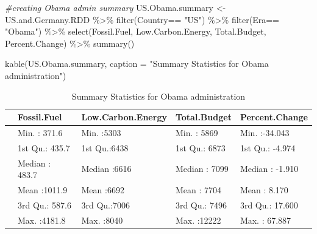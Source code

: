 \documentclass[
  12pt,
]{article}
\newenvironment{Shaded}{\begin{snugshade}}{\end{snugshade}}
\newcommand{\AttributeTok}[1]{\textcolor[rgb]{0.77,0.63,0.00}{#1}}
\newcommand{\CommentTok}[1]{\textcolor[rgb]{0.56,0.35,0.01}{\textit{#1}}}
\newcommand{\FunctionTok}[1]{\textcolor[rgb]{0.00,0.00,0.00}{#1}}
\newcommand{\NormalTok}[1]{#1}
\newcommand{\OtherTok}[1]{\textcolor[rgb]{0.56,0.35,0.01}{#1}}
\newcommand{\SpecialCharTok}[1]{\textcolor[rgb]{0.00,0.00,0.00}{#1}}
\newcommand{\StringTok}[1]{\textcolor[rgb]{0.31,0.60,0.02}{#1}}
\begin{document}
\begin{Shaded}
\begin{Highlighting}[]
\CommentTok{\#creating Obama admin summary}
\NormalTok{US.Obama.summary }\OtherTok{\textless{}{-}}\NormalTok{ US.and.Germany.RDD }\SpecialCharTok{\%\textgreater{}\%}
  \FunctionTok{filter}\NormalTok{(Country}\SpecialCharTok{==} \StringTok{"US"}\NormalTok{) }\SpecialCharTok{\%\textgreater{}\%}
  \FunctionTok{filter}\NormalTok{(Era}\SpecialCharTok{==} \StringTok{"Obama"}\NormalTok{) }\SpecialCharTok{\%\textgreater{}\%}
  \FunctionTok{select}\NormalTok{(Fossil.Fuel, Low.Carbon.Energy, Total.Budget, Percent.Change) }\SpecialCharTok{\%\textgreater{}\%}
  \FunctionTok{summary}\NormalTok{()}

\FunctionTok{kable}\NormalTok{(US.Obama.summary, }\AttributeTok{caption =} \StringTok{"Summary Statistics for Obama administration"}\NormalTok{)}
\end{Highlighting}
\end{Shaded}

\begin{table}

\caption{\label{tab:calculating the summary statistics for US and Germany and creating tables}Summary Statistics for Obama administration}
\centering
\begin{tabular}[t]{l|l|l|l|l}
\hline
  &  Fossil.Fuel & Low.Carbon.Energy &  Total.Budget & Percent.Change\\
\hline
 & Min.   : 371.6 & Min.   :5303 & Min.   : 5869 & Min.   :-34.043\\
\hline
 & 1st Qu.: 435.7 & 1st Qu.:6438 & 1st Qu.: 6873 & 1st Qu.: -4.974\\
\hline
 & Median : 483.7 & Median :6616 & Median : 7099 & Median : -1.910\\
\hline
 & Mean   :1011.9 & Mean   :6692 & Mean   : 7704 & Mean   :  8.170\\
\hline
 & 3rd Qu.: 587.6 & 3rd Qu.:7006 & 3rd Qu.: 7496 & 3rd Qu.: 17.600\\
\hline
 & Max.   :4181.8 & Max.   :8040 & Max.   :12222 & Max.   : 67.887\\
\hline
\end{tabular}
\end{table}
\end{document}
